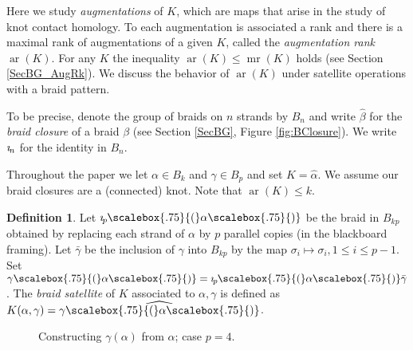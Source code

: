 \documentclass[11pt]{amsart}
\def\s{{\sigma}}
\def\ar{\operatorname{ar}}
\def\mr{\operatorname{mr}}
\newcommand*{\smallp}[1]{\scalebox{.75}{\ensuremath#1}}
\newcommand{\pp}[2][p]{\imath_{\hspace*{-1pt}#1}\hspace*{-.5pt}\smallp(#2\smallp)}
\theoremstyle{definition}
\newtheorem{defn}[thm]{Definition}
\begin{document}
Here we study \emph{augmentations} of $K$, which are maps that arise in the study of knot contact homology. To each augmentation is associated a rank and there is a maximal rank of augmentations of a given $K$, called the \emph{augmentation rank} $\ar(K)$. For any $K$ the inequality $\ar(K)\le \mr(K)$ holds (see Section \ref{SecBG_AugRk}). We discuss the behavior of $\ar(K)$ under satellite operations with a braid pattern. 

To be precise, denote the group of braids on $n$ strands by $B_n$ and write $\hat{\beta}$ for the \emph{braid closure} of a braid $\beta$ (see Section \ref{SecBG}, Figure \ref{fig:BClosure}). We write $\imath_{\hspace*{-1pt}n}$ for the identity in $B_n$. 

Throughout the paper we let $\alpha\in B_k$ and $\gamma\in B_p$ and set $K = \hat{\alpha}$. We assume our braid closures are a (connected) knot. Note that $\ar(K)\le k$.

\begin{defn} Let $\pp\alpha$ be the braid in $B_{kp}$ obtained by replacing each strand of $\alpha$ by $p$ parallel copies (in the blackboard framing). Let $\bar\gamma$ be the inclusion of $\gamma$ into $B_{kp}$ by the map $\s_i\mapsto\s_i, 1\le i\le p-1$. Set $\gamma\smallp(\alpha\smallp) = \pp\alpha\bar\gamma$. The \emph{braid satellite} of $K$ associated to $\alpha, \gamma$ is defined as $K(\alpha,\gamma) = \widehat{\gamma\smallp(\alpha\smallp)}$.
\label{defn:BraidSat}
\end{defn}

\begin{figure}[ht]
  \caption{Constructing $\gamma(\alpha)$ from $\alpha$; case $p=4$.}
  \label{FigBraidSat}
  \end{figure}
\end{document}
